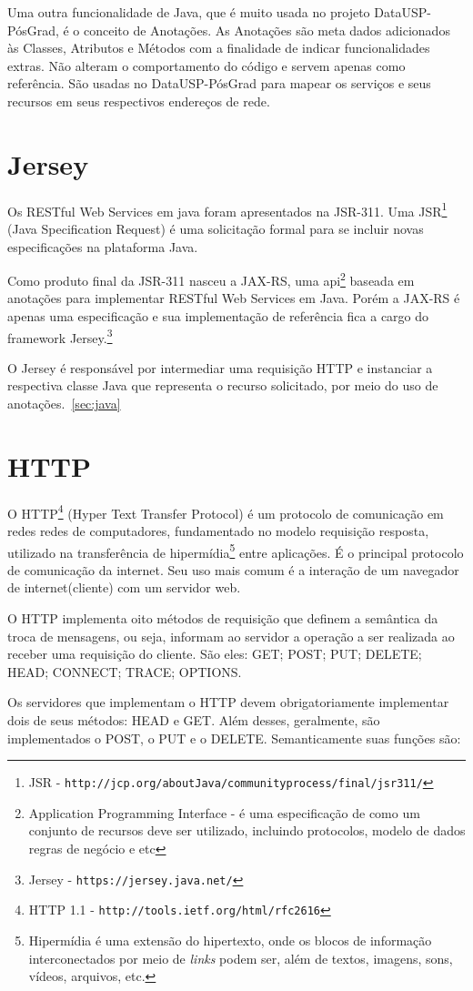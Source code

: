 \par
Uma outra funcionalidade de Java, que é muito usada no projeto DataUSP-PósGrad, é o conceito de Anotações. As Anotações são meta dados adicionados às Classes, Atributos e Métodos com a finalidade de indicar funcionalidades extras. Não alteram o comportamento do código e servem apenas como referência. São usadas no DataUSP-PósGrad para mapear os serviços e seus recursos em seus respectivos endereços de rede.

\section{Jersey}
\label{sec:jersey}
Os RESTful Web Services em java foram apresentados na JSR-311. Uma JSR\footnote{ JSR - \texttt{http://jcp.org/aboutJava/communityprocess/final/jsr311/}} (Java Specification Request) é uma solicitação formal para se incluir novas especificações na plataforma Java.
\par
Como produto final da JSR-311 nasceu a  JAX-RS, uma api\footnote{Application Programming Interface - é uma especificação de como um conjunto de recursos deve ser utilizado, incluindo protocolos, modelo de dados regras de negócio e etc} baseada em anotações para implementar RESTful Web Services em Java. Porém a JAX-RS é apenas uma especificação e sua implementação de 
referência fica a cargo do framework  Jersey.\footnote{Jersey - \texttt{https://jersey.java.net/}}
\par
O Jersey é responsável por intermediar uma requisição HTTP e instanciar a respectiva classe Java que representa o recurso solicitado, por meio do uso de anotações.~\ref{sec:java}

\section{HTTP}
\label{sec:http}
  O HTTP\footnote{HTTP 1.1 - \texttt{http://tools.ietf.org/html/rfc2616}} 
(Hyper Text Transfer Protocol) é um protocolo de comunicação em redes redes de computadores,  
fundamentado no  modelo requisição resposta, utilizado na transferência de hipermídia\footnote{Hipermídia é uma extensão do hipertexto, onde os blocos de informação interconectados por meio de \emph{links} podem ser, além de textos, imagens, sons, vídeos, arquivos, etc.} entre aplicações. É o principal protocolo de comunicação da internet. Seu uso mais comum é a interação de um navegador de internet(cliente) com um servidor web.
\par 
O HTTP implementa oito métodos de requisição que definem a semântica da 
troca de mensagens, ou seja, informam ao servidor a operação a ser realizada ao receber uma requisição do cliente. São eles: GET; POST; PUT; DELETE; HEAD; CONNECT; TRACE; OPTIONS.
\par
Os servidores que implementam o HTTP devem obrigatoriamente implementar dois de seus métodos: HEAD e GET. Além desses, geralmente, são implementados o POST, o PUT e o DELETE. Semanticamente suas funções são:

